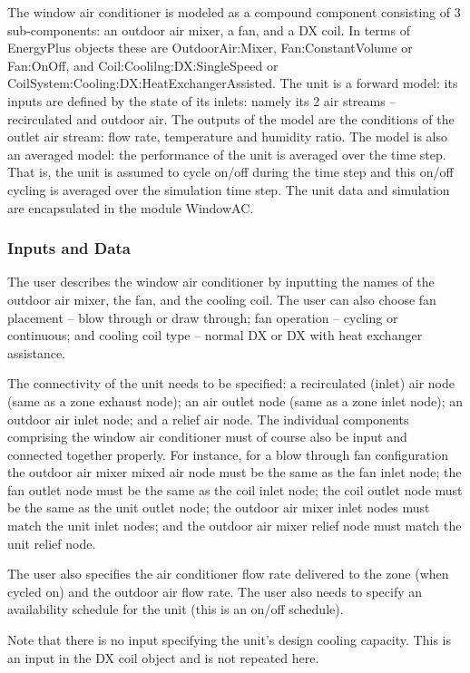 The window air conditioner is modeled as a compound component consisting of 3 sub-components: an outdoor air mixer, a fan, and a DX coil. In terms of EnergyPlus objects these are OutdoorAir:Mixer, Fan:ConstantVolume or Fan:OnOff, and Coil:Coolilng:DX:SingleSpeed or CoilSystem:Cooling:DX:HeatExchangerAssisted. The unit is a forward model: its inputs are defined by the state of its inlets: namely its 2 air streams -- recirculated and outdoor air. The outputs of the model are the conditions of the outlet air stream: flow rate, temperature and humidity ratio. The model is also an averaged model: the performance of the unit is averaged over the time step. That is, the unit is assumed to cycle on/off during the time step and this on/off cycling is averaged over the simulation time step. The unit data and simulation are encapsulated in the module WindowAC.

\subsubsection{Inputs and Data}\label{inputs-and-data-5}

The user describes the window air conditioner by inputting the names of the outdoor air mixer, the fan, and the cooling coil. The user can also choose fan placement -- blow through or draw through; fan operation -- cycling or continuous; and cooling coil type -- normal DX or DX with heat exchanger assistance.

The connectivity of the unit needs to be specified: a recirculated (inlet) air node (same as a zone exhaust node); an air outlet node (same as a zone inlet node); an outdoor air inlet node; and a relief air node. The individual components comprising the window air conditioner must of course also be input and connected together properly. For instance, for a blow through fan configuration the outdoor air mixer mixed air node must be the same as the fan inlet node; the fan outlet node must be the same as the coil inlet node; the coil outlet node must be the same as the unit outlet node; the outdoor air mixer inlet nodes must match the unit inlet nodes; and the outdoor air mixer relief node must match the unit relief node.

The user also specifies the air conditioner flow rate delivered to the zone (when cycled on) and the outdoor air flow rate. The user also needs to specify an availability schedule for the unit (this is an on/off schedule).

Note that there is no input specifying the unit's design cooling capacity. This is an input in the DX coil object and is not repeated here.

